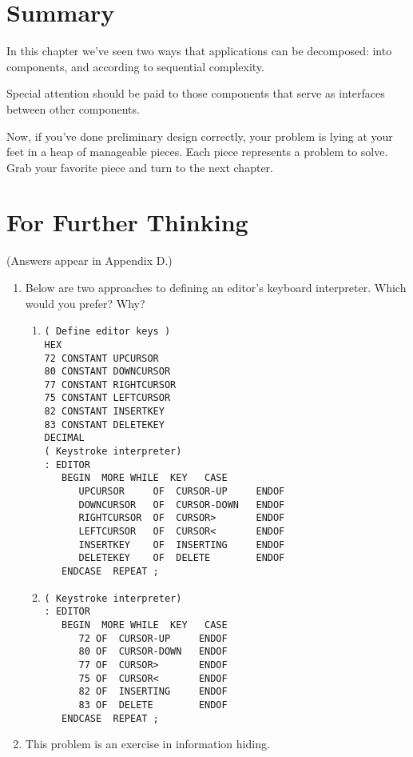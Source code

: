 \section{Summary}

In this chapter we've seen two ways that applications can be
decomposed: into components, and according to sequential complexity.

Special attention should be paid to those components that serve as
interfaces between other components.

Now, if you've done preliminary design correctly, your problem is
lying at your feet in a heap of manageable pieces. Each piece represents a
problem to solve. Grab your favorite piece and turn to the next chapter.

\section{For Further Thinking}

(Answers appear in Appendix D\fixme{}.)

\begin{enumerate}
\item Below are two approaches to defining an editor's keyboard interpreter.
Which would you prefer? Why?

\begin{enumerate}
\item \begin{verbatim}
( Define editor keys )
HEX
72 CONSTANT UPCURSOR
80 CONSTANT DOWNCURSOR
77 CONSTANT RIGHTCURSOR
75 CONSTANT LEFTCURSOR
82 CONSTANT INSERTKEY
83 CONSTANT DELETEKEY
DECIMAL
( Keystroke interpreter)
: EDITOR
   BEGIN  MORE WHILE  KEY   CASE
      UPCURSOR     OF  CURSOR-UP     ENDOF
      DOWNCURSOR   OF  CURSOR-DOWN   ENDOF
      RIGHTCURSOR  OF  CURSOR>       ENDOF
      LEFTCURSOR   OF  CURSOR<       ENDOF
      INSERTKEY    OF  INSERTING     ENDOF
      DELETEKEY    OF  DELETE        ENDOF
   ENDCASE  REPEAT ;
\end{verbatim}

\item \begin{verbatim}
( Keystroke interpreter)
: EDITOR
   BEGIN  MORE WHILE  KEY   CASE
      72 OF  CURSOR-UP     ENDOF
      80 OF  CURSOR-DOWN   ENDOF
      77 OF  CURSOR>       ENDOF
      75 OF  CURSOR<       ENDOF
      82 OF  INSERTING     ENDOF
      83 OF  DELETE        ENDOF
   ENDCASE  REPEAT ;
\end{verbatim}
\end{enumerate}

\item This problem is an exercise in information hiding.
\end{enumerate}

